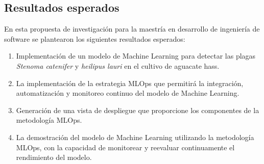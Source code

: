 \subsection{Resultados esperados}
En esta propuesta de investigación para la maestría en desarrollo de ingeniería de software se plantearon los siguientes resultados esperados:
\begin{enumerate}
  \item Implementación de un modelo de Machine Learning para detectar las plagas \textit{Stenoma catenifer} y \textit{heilipus lauri} en el cultivo de aguacate hass.
  \item La implementación de la estrategia MLOps que permitirá la integración, automatización y monitoreo continuo del modelo de Machine Learning. 
  \item Generación de una vista de despliegue que proporcione los componentes de la metodología MLOps.
  \item La demostración del modelo de Machine Learning utilizando la metodología MLOps, con la capacidad de monitorear y reevaluar continuamente el rendimiento del modelo.
\end{enumerate}